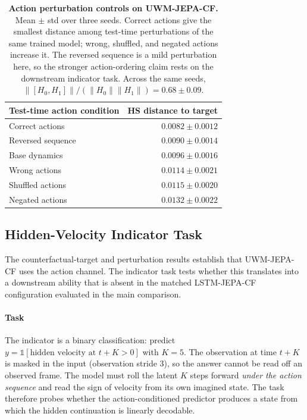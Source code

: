 \begin{table}[t]
\centering
\footnotesize
\setlength{\tabcolsep}{3pt}
\caption{\textbf{Action perturbation controls on UWM-JEPA-CF.}
Mean $\pm$ std over three seeds. Correct actions give the smallest
distance among test-time perturbations of the same trained model;
wrong, shuffled, and negated actions increase it. The reversed sequence
is a mild perturbation here, so the stronger action-ordering claim rests
on the downstream indicator task. Across the same seeds,
$\|[H_0,H_1]\|/(\|H_0\|\|H_1\|)=0.68\pm0.09$.}
\label{tab:action-controls}
\begin{tabularx}{\columnwidth}{@{}Xr@{}}
\toprule
Test-time action condition & HS distance to target \\
\midrule
Correct actions      & $\mathbf{0.0082 \pm 0.0012}$ \\
Reversed sequence    & $0.0090 \pm 0.0014$ \\
Base dynamics        & $0.0096 \pm 0.0016$ \\
Wrong actions        & $0.0114 \pm 0.0021$ \\
Shuffled actions     & $0.0115 \pm 0.0020$ \\
Negated actions      & $0.0132 \pm 0.0022$ \\
\bottomrule
\end{tabularx}
\end{table}

\subsection{Hidden-Velocity Indicator Task}
\label{sec:indicator}

The counterfactual-target and perturbation results establish that
UWM-JEPA-CF uses the action channel. The indicator task tests whether
this translates into a downstream ability that is absent in the
matched LSTM-JEPA-CF configuration evaluated in the main comparison.

\paragraph{Task}
The indicator is a binary classification: predict
$y = \mathbb{1}[\text{hidden velocity at } t+K > 0]$ with $K = 5$.
The observation at time $t+K$ is masked in the input (observation
stride $3$), so the answer cannot be read off an observed frame. The
model must roll the latent $K$ steps forward \emph{under the action
sequence} and read the sign of velocity from its own imagined state.
The task therefore probes whether the action-conditioned predictor
produces a state from which the hidden continuation is linearly
decodable.

